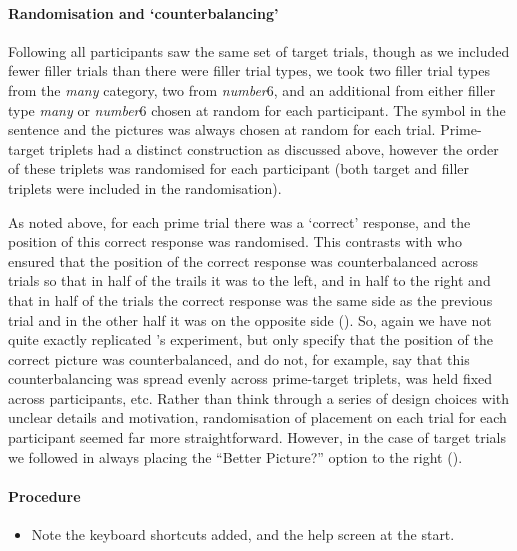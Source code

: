 \documentclass[10pt]{article}
\begin{document}
\begin{multicols}{2}
\paragraph{Randomisation and `counterbalancing'}

Following \citeauthor{Bott:2016aa} all participants saw the same set of target trials, though as we included fewer filler trials than there were filler trial types, we took two filler trial types from the \emph{many} category, two from \emph{number\(6\)}, and an additional from either filler type \emph{many} or \emph{number\(6\)} chosen at random for each participant.
The symbol in the sentence and the pictures was always chosen at random for each trial.
Prime-target triplets had a distinct construction as discussed above, however the order of these triplets was randomised for each participant (both target and filler triplets were included in the randomisation).

As noted above, for each prime trial there was a `correct' response, and the position of this correct response was randomised.
This contrasts with \citeauthor{Bott:2016aa} who ensured that the position of the correct response was counterbalanced across trials so that in half of the trails it was to the left, and in half to the right and that in half of the trials the correct response was the same side as the previous trial and in the other half it was on the opposite side (\citeyear[124]{Bott:2016aa}).
So, again we have not quite exactly replicated \citeauthor{Bott:2016aa}'s experiment, but \citeauthor{Bott:2016aa} only specify that the position of the correct picture was counterbalanced, and do not, for example, say that this counterbalancing was spread evenly across prime-target triplets, was held fixed across participants, etc.
Rather than think through a series of design choices with unclear details and motivation, randomisation of placement on each trial for each participant seemed far more straightforward.
However, in the case of target trials we followed \citeauthor{Bott:2016aa} in always placing the ``Better Picture?'' option to the right (\citeyear[124]{Bott:2016aa}).

\paragraph{Procedure}

\begin{itemize}
\item Note the keyboard shortcuts added, and the help screen at the start.
\end{itemize}



\end{multicols}
\end{document}
